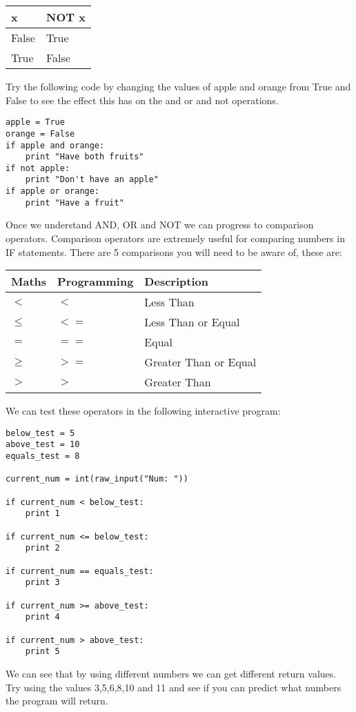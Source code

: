 \documentclass[twocolumn]{article}
\begin{document}
\begin{center}
	\begin{tabular}{| l || l | } 
		\hline
		x & NOT x \\ \hline
		False & True \\
		True & False \\
		\hline
	\end{tabular}
\end{center}
Try the following code by changing the values of apple and orange from True and False to see the effect this has on the and or and not operations.
\begin{lstlisting}
apple = True
orange = False
if apple and orange:
	print "Have both fruits"
if not apple:
	print "Don't have an apple"
if apple or orange:
	print "Have a fruit"
\end{lstlisting}
Once we understand AND, OR and NOT we can progress to comparison operators. Comparison operators are extremely useful for comparing numbers in IF statements. There are 5 comparisons you will need to be aware of, these are:
\begin{center}
	\begin{tabular}{| l | l | l |} 
		\hline
		Maths & Programming & Description\\ \hline
		$<$ & $<$ & Less Than\\
		$\le$ & $<=$ & Less Than or Equal\\
		$=$ & $==$ & Equal\\
		$\ge$ & $>=$ & Greater Than or Equal\\
		$>$ & $>$ & Greater Than\\
		\hline
	\end{tabular}
\end{center}
We can test these operators in the following interactive program:
\begin{lstlisting}
below_test = 5
above_test = 10
equals_test = 8

current_num = int(raw_input("Num: "))

if current_num < below_test:
	print 1

if current_num <= below_test:
	print 2

if current_num == equals_test:
	print 3

if current_num >= above_test:
	print 4

if current_num > above_test:
	print 5
\end{lstlisting}
We can see that by using different numbers we can get different return values. Try using the values 3,5,6,8,10 and 11 and see if you can predict what numbers the program will return.
\end{document}
